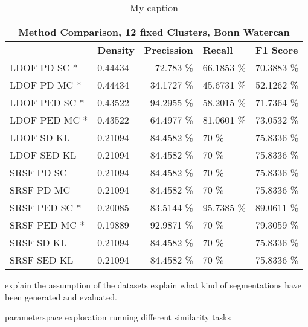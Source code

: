 \begin{table}[]
\centering
\begin{tabular}{|l|l|r|l|l|}
\hline
\multicolumn{5}{|c|}{Method Comparison, 12 fixed Clusters, Bonn Watercan}                        \\ \hline
              & \textbf{Density} & \textbf{Precission} & \textbf{Recall} & \textbf{F1 Score} \\ \hline
LDOF PD SC * & 0.44434 & 72.783 \%   & 66.1853 \%     & 70.3883 \%  \\ \hline
LDOF PD MC * & 0.44434 & 34.1727 \%   & 45.6731 \%     & 52.1262 \%  \\ \hline              
LDOF PED SC * & 0.43522 & 94.2955 \%   & 58.2015 \%     & 71.7364 \%  \\ \hline
LDOF PED MC * & 0.43522 & 64.4977 \%   & 81.0601 \%     & 73.0532 \%  \\ \hline
LDOF SD KL & 0.21094 & 84.4582 \%   & 70 \%     & 75.8336 \%  \\ \hline
LDOF SED KL & 0.21094 & 84.4582 \%   & 70 \%     & 75.8336 \%  \\ \hline
SRSF PD SC & 0.21094 & 84.4582 \%   & 70 \%     & 75.8336 \%  \\ \hline
SRSF PD MC & 0.21094 & 84.4582 \%   & 70 \%     & 75.8336 \%  \\ \hline
SRSF PED SC * & 0.20085 & 83.5144 \%   & 95.7385 \%     & 89.0611 \%  \\ \hline
SRSF PED MC * & 0.19889 & 92.9871 \%   & 70 \%     & 79.3059 \%  \\ \hline
SRSF SD KL & 0.21094 & 84.4582 \%   & 70 \%     & 75.8336 \%  \\ \hline
SRSF SED KL & 0.21094 & 84.4582 \%   & 70 \%     & 75.8336 \%  \\ \hline
\end{tabular}
\caption[Method Comparision Bonn Watercan]{My caption}
\label{tab:bonn_wc_methods}
\end{table}


explain the assumption of the datasets
explain what kind of segmentations have been generated and evaluated.







parameterspace exploration
running different similarity tasks




